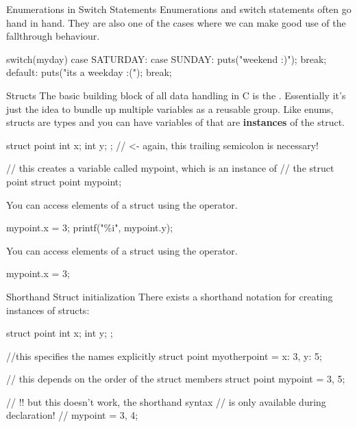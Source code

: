 \documentclass[10pt,graphics,aspectratio=169,table]{beamer}
\begin{document}
\begin{frame}[fragile]{Enumerations in Switch Statements}
    Enumerations and switch statements often go hand in hand.
    They are also one of the cases where we can make good use of the
    fallthrough behaviour.
    \begin{codeblock}
switch(myday){
    case SATURDAY: 
    case SUNDAY: {
        puts("weekend :)");
    } break;
    default: {
        puts("its a weekday :("); 
    } break;
}
    \end{codeblock}
\end{frame}

\begin{frame}[fragile]{Structs}
    The basic building block of all data handling in C is the .
    Essentially it's just the idea to bundle up multiple variables as a reusable
    group. Like enums, structs are types and you can have variables of 
    that are \textbf{instances} of the struct.
    \begin{codeblock}
struct point{
    int x;
    int y;
}; // <- again, this trailing semicolon is necessary!

// this creates a variable called mypoint, which is an instance of
// the struct point
struct point mypoint;
    \end{codeblock}

    You can access elements of a struct using the  operator.
    \begin{codeblock}
mypoint.x = 3;
printf("\%i\n", mypoint.y);
    \end{codeblock}

    You can access elements of a struct using the  operator.
    \begin{codeblock}
mypoint.x = 3;
    \end{codeblock}
    
\end{frame}

\begin{frame}[fragile]{Shorthand Struct initialization}
    There exists a shorthand notation for creating instances of structs:
    \begin{codeblock}
struct point{
    int x;
    int y;
}; 

//this specifies the names explicitly
struct point myotherpoint = {x: 3, y: 5};

// this depends on the order of the struct members
struct point mypoint = {3, 5};

// !! but this doesn't work, the shorthand syntax
// is only available during declaration!
// mypoint = {3, 4};
    \end{codeblock}

\end{frame}
\end{document}
